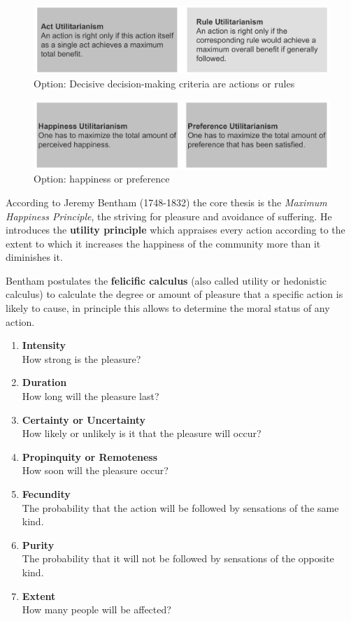 \documentclass[11pt]{article}
\theoremstyle{definition}
\begin{document}
\begin{figure}[tbh]
	\centering
	\includegraphics[width=0.8\linewidth]{img/act-rule-utilitarianism}
	\caption{Option: Decisive decision-making criteria are actions or rules}
	\label{fig:act-rule-utilitarianism}
\end{figure}

\begin{figure}[tbh]
	\centering
	\includegraphics[width=0.8\linewidth]{img/happiness-preference-utilitarianism}
	\caption{Option: happiness or preference}
	\label{fig:happiness-preference-utilitarianism}
\end{figure}

According to Jeremy Bentham (1748-1832) the core thesis is the \textit{Maximum Happiness Principle}, the striving for pleasure and avoidance of suffering. He introduces the \textbf{utility principle} which appraises every action according to the extent to which it increases the happiness of the community more than it diminishes it.

\clearpage
Bentham postulates the \textbf{felicific calculus} (also called utility or hedonistic calculus) to calculate the degree or amount of pleasure that a specific action is likely to cause, in principle this allows to determine the moral status of any action.
\begin{enumerate}[nosep]
	\item \textbf{Intensity}\\
	How strong is the pleasure?
	\item \textbf{Duration}\\
	How long will the pleasure last?
	\item \textbf{Certainty or Uncertainty}\\
	How likely or unlikely is it that the pleasure will occur?
	\item \textbf{Propinquity or Remoteness}\\
	How soon will the pleasure occur?
	\item \textbf{Fecundity}\\
	The probability that the action will be followed by sensations of the same kind.
	\item \textbf{Purity}\\
	The probability that it will not be followed by sensations of the opposite kind.
	\item \textbf{Extent}\\
	How many people will be affected?
\end{enumerate}
\end{document}
